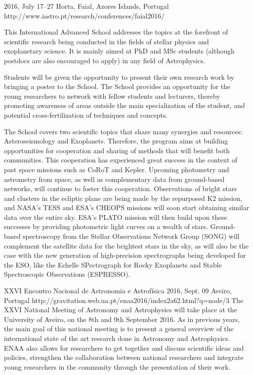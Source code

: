 {2016, July 17--27}%
{Horta, Faial, Azores Islands, Portugal}%
{http://www.iastro.pt/research/conferences/faial2016/}%
{}%
{This International Advanced School addresses the topics at the forefront of scientific research being conducted in the fields of stellar physics and exoplanetary science. It is mainly aimed at PhD and MSc students (although postdocs are also encouraged to apply) in any field of Astrophysics.

Students will be given the opportunity to present their own research work by bringing a poster to the School. The School provides an opportunity for the young researchers to network with fellow students and lecturers, thereby promoting awareness of areas outside the main specialization of the student, and potential cross-fertilization of techniques and concepts.

The School covers two scientific topics that share many synergies and resources: Asteroseismology and Exoplanets. Therefore, the program aims at building opportunities for cooperation and sharing of methods that will benefit both communities. This cooperation has experienced great success in the context of past space missions such as CoRoT and Kepler. Upcoming photometry and astrometry from space, as well as complementary data from ground-based networks, will continue to foster this cooperation. Observations of bright stars and clusters in the ecliptic plane are being made by the repurposed K2 mission, and NASA's TESS and ESA's CHEOPS missions will soon start obtaining similar data over the entire sky. ESA's PLATO mission will then build upon these successes by providing photometric light curves on a wealth of stars. Ground-based spectroscopy from the Stellar Observations Network Group (SONG) will complement the satellite data for the brightest stars in the sky, as will also be the case with the new generation of high-precision spectrographs being developed for the ESO, like the Echelle SPectrograph for Rocky Exoplanets and Stable Spectroscopic Observations (ESPRESSO).}%

 {XXVI Encontro Nacional de Astronomia e Astrofísica}%
{2016, Sept. 09}%
{Aveiro, Portugal}%
{http://gravitation.web.ua.pt/enaa2016/index2a62.html?q=node/3}%
{}%
{The XXVI National Meeting of Astronomy and Astrophysics will take place at the University of Aveiro, on the 8th and 9th September 2016. As in previous years, the main goal of this national meeting is to present a general overview of the international state of the art research done in Astronomy and Astrophysics. ENAA also allows for researchers to get together and discuss scientific ideas and policies, strengthen the collaboration between national researchers and integrate young researchers in the community through the presentation of their work.}


